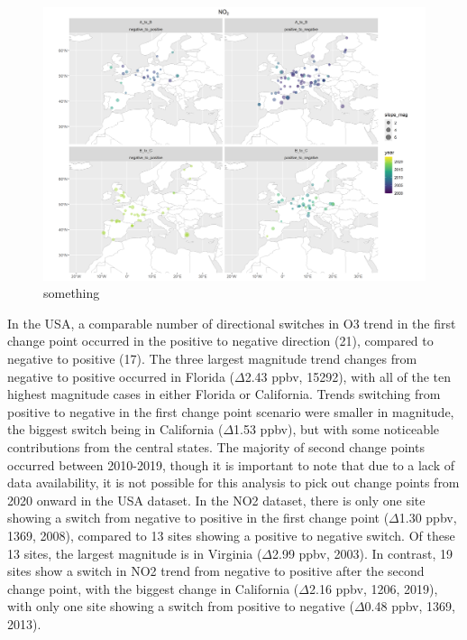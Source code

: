 \documentclass[journal abbreviation, manuscript]{copernicus}
\begin{document}
\begin{figure}[t]
\includegraphics[width=12cm]{plots/EU_no2_tau_0.5_changepoint_year_mag_map.png}
\caption{something}
\label{us_no2_changepoint_map}
\end{figure}

In the USA, a comparable number of directional switches in O3 trend in the first change point occurred in the positive to negative direction (21), compared to negative to positive (17). The three largest magnitude trend changes from negative to positive occurred in Florida ($\Delta$2.43 ppbv, 15292), with all of the ten highest magnitude cases in either Florida or California. Trends switching from positive to negative in the first change point scenario were smaller in magnitude, the biggest switch being in California ($\Delta$1.53 ppbv), but with some noticeable contributions from the central states. The majority of second change points occurred between 2010-2019, though it is important to note that due to a lack of data availability, it is not possible for this analysis to pick out change points from 2020 onward in the USA dataset. In the NO2 dataset, there is only one site showing a switch from negative to positive in the first change point ($\Delta$1.30 ppbv, 1369, 2008), compared to 13 sites showing a positive to negative switch. Of these 13 sites, the largest magnitude is in Virginia ($\Delta$2.99 ppbv, 2003). In contrast, 19 sites show a switch in NO2 trend from negative to positive after the second change point, with the biggest change in California ($\Delta$2.16 ppbv, 1206, 2019), with only one site showing a switch from positive to negative ($\Delta$0.48 ppbv, 1369, 2013).
\end{document}
